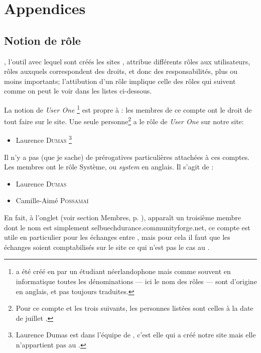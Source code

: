 \chapter{Appendices}

\section[Notion de rôle]{Notion de rôle}\label{sec:responsabilitesSite}

\drupal, l'outil avec lequel sont créés les sites \CF, attribue différents rôles aux utilisateurs, rôles auxquels correspondent des droits, et donc des responsabilités, plus ou moins importants; l'attibution d'un rôle implique celle des rôles qui suivent comme on peut le voir dans les listes ci-dessous.


La notion de \emph{User One}%
\footnote{\drupal{} a été créé en  par un étudiant néerlandophone mais comme souvent en informatique toutes les dénominations --- ici le nom des rôles --- sont d'origine en anglais, et pas toujours traduites.} 
est propre à \drupal: les membres de ce compte ont le droit de tout faire sur le site. Une seule personne\footnote{Pour ce compte et les trois suivants, les personnes listées sont celles à la date de juillet .} a le rôle de \emph{User One} sur notre site:

\begin{itemize}
    \item Laurence \textsc{Dumas}%
    \footnote{Laurence Dumas est dans l'équipe de \CF, c'est elle qui a créé notre site mais elle n'appartient pas au \CdS.}
\end{itemize}

\label{sec:comptesSel}

Il n'y a pas (que je sache) de prérogatives particulières attachées à ces comptes. Les membres ont le rôle \og Système\fg, ou \emph{system} en anglais. Il s'agit de :

\begin{itemize}
    \item Laurence \textsc{Dumas}
    \item Camille-Aimé \textsc{Possamaï}
\end{itemize}

En fait, à l'onglet  (voir section \og Membres\fg, p. \pageref{sec:membres}), apparaît un troisième membre dont le nom est simplement \og selbuechdurance.communityforge.net\fg, ce compte est utile en particulier pour les échanges entre \sel, mais pour cela il faut que les échanges soient comptabilisés sur le site ce qui n'est pas le cas au \CdS.

